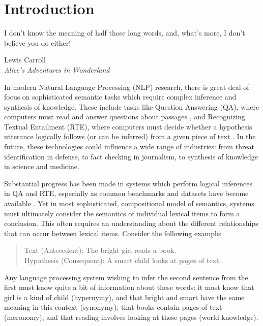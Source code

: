 \chapter{Introduction}

\epigraph{I don't know the meaning of half those long words, and, what's more,
I don't believe you do either!}{Lewis Carroll\\ \textit{Alice's Adventures in
Wonderland}}

\label{sec:intro}

In modern Natural Language Processing (NLP) research, there is great deal of
focus on sophisticated semantic tasks which require complex inference and
synthesis of knowledge. These include tasks like Question Answering (QA), where
computers must read and answer questions about passages
\cite{hermann:2015:nips,weston:2016:iclr}, and Recognizing Textual Entailment
(RTE), where computers must decide whether a hypothesis utterance logically
follows (or can be inferred) from a given piece of text
\cite{dagan:2006:mlc,marelli:2014:semeval,bowman:2015:emnlp}. In the future,
these technologies could influence a wide range of industries: from threat
identification in defense, to fact checking in journalism, to
synthesis of knowledge in science and medicine.

Substantial progress has been made in systems which perform
logical inferences in QA and RTE, especially as common benchmarks
and datasets have become available
\cite{dagan:2006:mlc,giampiccolo:2007:pascal,bentivogli:2009:tac,marelli:2014:semeval,bowman:2015:emnlp}.
Yet in most sophisticated, compositional model of semantics, systems must
ultimately consider the semantics of individual lexical items to form a
conclusion. This often requires an understanding about the different
relationships that can occur between lexical items. Consider the following
example:
\begin{quote}
  Text (Antecedent): The bright girl reads a book.\\
  Hypothesis (Consequent): A smart child looks at pages of text.
\end{quote}
Any language processing system wishing to infer the second sentence from the
first must know quite a bit of information about these words: it must know that
girl is a kind of child (hypernymy), and that bright and smart have the same
meaning in this context (synonymy); that books contain pages of text
(meronomy), and that reading involves looking at these pages (world knowledge).

